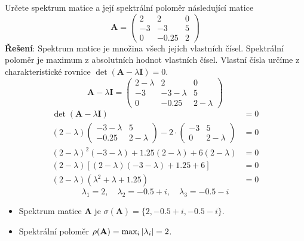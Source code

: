 \begin{mdframed}[style=mdexam]
  \begin{example}\label{mai:exam013}
    Určete spektrum matice a její spektrální poloměr následující matice
      \begin{equation*}\label{pr:spektrum_matice}
        \mathbf{A} =
          \begin{pmatrix}
            2  &  2    & 0 \\
          -3  & -3    & 5 \\
            0  & -0.25 & 2
          \end{pmatrix}
      \end{equation*}
    \textbf{Řešení}: Spektrum matice je množina všech jejích vlastních čísel. Spektrální poloměr 
    je maximum z absolutních hodnot vlastních čísel. Vlastní čísla určíme z charakteristické
    rovnice \(\det(\mathbf{A}-\lambda \mathbf{I})=0\).
      \begin{equation*}
        \textbf{A} - \lambda\textbf{I}=
          \begin{pmatrix}
            2-\lambda  &  2          & 0 \\
          -3          & -3-\lambda  & 5 \\
            0          & -0.25       & 2-\lambda
        \end{pmatrix}
      \end{equation*}
      \begin{align}
        \det(\mathbf{A}-\lambda \mathbf{I})                    &= 0           \nonumber\\
        (2-\lambda)
          \begin{pmatrix}
            -3-\lambda  &  5\\
              -0.25    &  2 - \lambda
          \end{pmatrix} -2\cdot
          \begin{pmatrix}
            -3       &  5\\
            0       &  2 - \lambda
          \end{pmatrix}                                        &= 0           \nonumber\\
        (2-\lambda)^2(-3-\lambda)+1.25(2-\lambda)+6(2-\lambda) &= 0           \nonumber\\
        (2-\lambda)[(2-\lambda)(-3-\lambda)+1.25+6]            &= 0           \nonumber\\
        (2-\lambda)(\lambda^2+\lambda+1.25)                    &= 0           \nonumber
      \end{align}
      \begin{equation*}
        \lambda_1 = 2, \quad\lambda_2 = -0.5+i, \quad\lambda_3=-0.5-i
      \end{equation*}
      \begin{itemize}
        \item Spektrum matice \(\mathbf{A}\) je \(\sigma(\mathbf{A})=\{2,-0.5+i,-0.5-i\}\).
        \item Spektrální poloměr \(\rho(\mathbf{A})=\max_i\left\lvert\lambda_i\right\rvert=2\).
      \end{itemize}


\end{example}
\end{mdframed}
